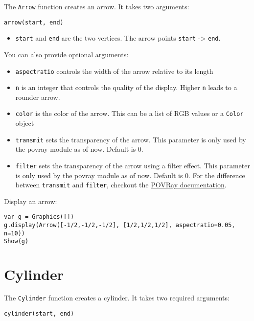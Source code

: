 The \texttt{Arrow} function creates an arrow. It takes two arguments:

\begin{lstlisting}
arrow(start, end)
\end{lstlisting}

\begin{itemize}

\item
  \texttt{start} and \texttt{end} are the two vertices. The arrow points
  \texttt{start} -\textgreater{} \texttt{end}.
\end{itemize}

You can also provide optional arguments:

\begin{itemize}

\item
  \texttt{aspectratio} controls the width of the arrow relative to its
  length
\item
  \texttt{n} is an integer that controls the quality of the display.
  Higher \texttt{n} leads to a rounder arrow.
\item
  \texttt{color} is the color of the arrow. This can be a list of RGB
  values or a \texttt{Color} object
\item
  \texttt{transmit} sets the transparency of the arrow. This parameter
  is only used by the povray module as of now. Default is 0.
\item
  \texttt{filter} sets the transparency of the arrow using a filter
  effect. This parameter is only used by the povray module as of now.
  Default is 0. For the difference between \texttt{transmit} and
  \texttt{filter}, checkout the
  \href{http://xahlee.info/3d/povray-glassy.html}{POVRay documentation}.
\end{itemize}

Display an arrow:

\begin{lstlisting}
var g = Graphics([])
g.display(Arrow([-1/2,-1/2,-1/2], [1/2,1/2,1/2], aspectratio=0.05, n=10))
Show(g)
\end{lstlisting}

\hypertarget{cylinder}{%
\section{Cylinder}\label{cylinder}}

The \texttt{Cylinder} function creates a cylinder. It takes two required
arguments:

\begin{lstlisting}
cylinder(start, end)
\end{lstlisting}

